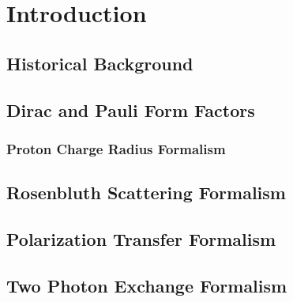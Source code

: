 \section{Introduction}
\label{sec:intro}

\subsection{Historical Background}
\label{subsec:history}

\subsection{Dirac and Pauli Form Factors}
\label{subsec:dirac}

\subsubsection{Proton Charge Radius Formalism}
\label{subsubsec:radius}

\subsection{Rosenbluth Scattering Formalism}
\label{subsec:rosenbluth}

\subsection{Polarization Transfer Formalism}
\label{subsec:poltrans}

\subsection{Two Photon Exchange Formalism}
\label{subsec:tpe}

